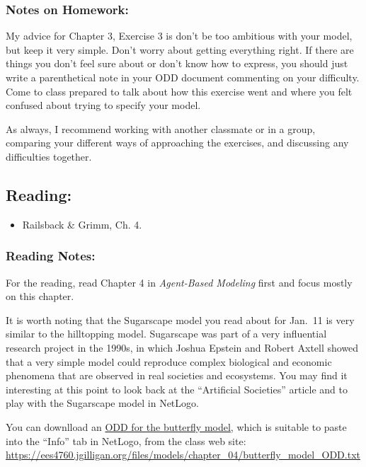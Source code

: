 \documentclass[]{article}
\providecommand{\tightlist}{%
  \setlength{\itemsep}{0pt}\setlength{\parskip}{0pt}}
\begin{document}
\hypertarget{notes-on-homework-1}{%
\subsubsection{Notes on Homework:}\label{notes-on-homework-1}}

My advice for Chapter 3, Exercise 3 is don't be too ambitious with your
model, but keep it very simple. Don't worry about getting everything
right. If there are things you don't feel sure about or don't know how
to express, you should just write a parenthetical note in your ODD
document commenting on your difficulty. Come to class prepared to talk
about how this exercise went and where you felt confused about trying to
specify your model.

As always, I recommend working with another classmate or in a group,
comparing your different ways of approaching the exercises, and
discussing any difficulties together.

\hypertarget{reading-4}{%
\subsection{Reading:}\label{reading-4}}

\begin{itemize}
\tightlist
\item
  Railsback \& Grimm, Ch. 4.
\end{itemize}

\hypertarget{reading-notes-3}{%
\subsubsection{Reading Notes:}\label{reading-notes-3}}

For the reading, read Chapter 4 in \emph{Agent-Based Modeling} first and
focus mostly on this chapter.

It is worth noting that the Sugarscape model you read about for Jan.~11
is very similar to the hilltopping model. Sugarscape was part of a very
influential research project in the 1990s, in which Joshua Epstein and
Robert Axtell showed that a very simple model could reproduce complex
biological and economic phenomena that are observed in real societies
and ecosystems. You may find it interesting at this point to look back
at the ``Artificial Societies'' article and to play with the Sugarscape
model in NetLogo.

You can downlload an
\href{/files/models/chapter_04/butterfly_model_ODD.txt}{ODD for the
butterfly model}, which is suitable to paste into the ``Info'' tab in
NetLogo, from the class web site:
\url{https://ees4760.jgilligan.org/files/models/chapter_04/butterfly_model_ODD.txt}
\end{document}
